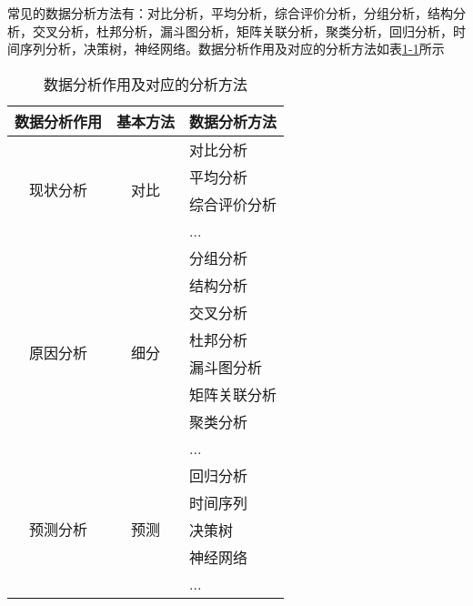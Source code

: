 常见的数据分析方法有：对比分析，平均分析，综合评价分析，分组分析，结构分析，交叉分析，杜邦分析，漏斗图分析，矩阵关联分析，聚类分析，回归分析，时间序列分析，决策树，神经网络。数据分析作用及对应的分析方法如表\href{table:1-1}{1-1}所示
\begin{table}[!hpb]
\centering
\caption{数据分析作用及对应的分析方法}
\begin{tabular}{|c|c|l}
\hline
\multicolumn{1}{|l|}{数据分析作用} & \multicolumn{1}{l|}{基本方法} & \multicolumn{1}{l|}{数据分析方法} \\ \hline
\multirow{4}{*}{现状分析}        & \multirow{4}{*}{对比}       & \multicolumn{1}{l|}{对比分析}   \\ \cline{3-3}
                             &                           & \multicolumn{1}{l|}{平均分析}   \\ \cline{3-3}
                             &                           & \multicolumn{1}{l|}{综合评价分析} \\ \cline{3-3}
                             &                           & \multicolumn{1}{l|}{...}    \\ \hline
\multirow{8}{*}{原因分析}        & \multirow{8}{*}{细分}       & \multicolumn{1}{l|}{分组分析}   \\ \cline{3-3}
                             &                           & \multicolumn{1}{l|}{结构分析}   \\ \cline{3-3}
                             &                           & \multicolumn{1}{l|}{交叉分析}   \\ \cline{3-3}
                             &                           & \multicolumn{1}{l|}{杜邦分析}   \\ \cline{3-3}
                             &                           & \multicolumn{1}{l|}{漏斗图分析}  \\ \cline{3-3}
                             &                           & \multicolumn{1}{l|}{矩阵关联分析} \\ \cline{3-3}
                             &                           & \multicolumn{1}{l|}{聚类分析}   \\ \cline{3-3}
                             &                           & \multicolumn{1}{l|}{...}    \\ \hline
\multirow{5}{*}{预测分析}        & \multirow{5}{*}{预测}       & \multicolumn{1}{l|}{回归分析}   \\ \cline{3-3}
                             &                           & \multicolumn{1}{l|}{时间序列}   \\ \cline{3-3}
                             &                           & \multicolumn{1}{l|}{决策树}    \\ \cline{3-3}
                             &                           & \multicolumn{1}{l|}{神经网络}  \\ \cline{3-3}
                             &                           & \multicolumn{1}{l|}{...}    \\ \hline
\end{tabular}
\label{table:1-1}
\end{table}

